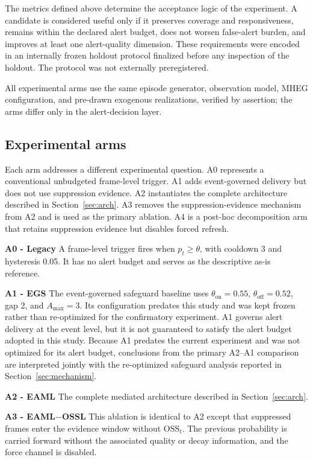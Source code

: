 \documentclass[conference]{IEEEtran}
\newcommand{\osst}{\mathrm{OSS}_t}
\begin{document}
The metrics defined above determine the acceptance logic of the
experiment. A candidate is considered useful only if it preserves
coverage and responsiveness, remains within the declared alert budget,
does not worsen false-alert burden, and improves at least one alert-quality
dimension. These requirements were encoded in an internally frozen
holdout protocol finalized before any inspection of the holdout. The
protocol was not externally preregistered.

All experimental arms use the same episode generator, observation
model, MHEG configuration, and pre-drawn exogenous realizations,
verified by assertion; the arms differ only in the alert-decision
layer.

\subsection{Experimental arms}

Each arm addresses a different experimental question. A0 represents a
conventional unbudgeted frame-level trigger. A1 adds event-governed
delivery but does not use suppression evidence. A2 instantiates the
complete architecture described in Section~\ref{sec:arch}. A3 removes
the suppression-evidence mechanism from A2 and is used as the primary
ablation. A4 is a post-hoc decomposition arm that retains suppression
evidence but disables forced refresh.

\textbf{A0 - Legacy}
A frame-level trigger fires when $p_t\geq\theta$, with cooldown 3 and
hysteresis 0.05. It has no alert budget and serves as the descriptive
as-is reference.

\textbf{A1 - EGS}
The event-governed safeguard baseline uses
$\theta_{\mathrm{on}}{=}0.55$, $\theta_{\mathrm{off}}{=}0.52$, gap 2,
and $A_{\max}{=}3$. Its configuration predates this study and was kept
frozen rather than re-optimized for the confirmatory experiment. A1
governs alert delivery at the event level, but it is not guaranteed to
satisfy the alert budget adopted in this study. Because A1 predates the
current experiment and was not optimized for its alert budget,
conclusions from the primary A2--A1 comparison are interpreted jointly
with the re-optimized safeguard analysis reported in
Section~\ref{sec:mechanism}.

\textbf{A2 - EAML}
The complete mediated architecture described in
Section~\ref{sec:arch}.

\textbf{A3 - EAML$-$OSSL}
This ablation is identical to A2 except that suppressed frames enter the
evidence window without $\osst$. The previous probability is carried
forward without the associated quality or decay information, and the
force channel is disabled.
\end{document}

